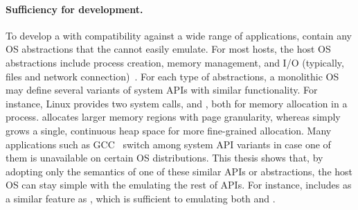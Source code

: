 \paragraph{Sufficiency for \libos{} development.}
To develop a \libos{} with compatibility against a wide range of applications,
\thehostabi{}
contain any OS abstractions that the \libos{} cannot easily emulate.
For most hosts,
the host OS abstractions
include
process creation, memory management, and I/O (typically, files and network connection)~\cite{dhamdhere2007os-textbook}.
For each type of abstractions,
a monolithic OS may define several variants of system APIs with similar functionality.
For instance, Linux provides two system calls,  and , both for memory allocation in a process.
 allocates larger memory regions with page granularity,
whereas  simply grows a single, continuous heap space for more fine-grained allocation.
Many applications such as GCC~\cite{gcc}
switch among system API variants in case one of them is unavailable on certain OS distributions.
This thesis shows that,
by adopting only the semantics of one of these similar APIs or abstractions, the host OS can stay simple with
the \libos{} emulating the rest of APIs.
For instance, \thehostabi{} includes 
as a similar feature as ,
which is sufficient to emulating both  and .




